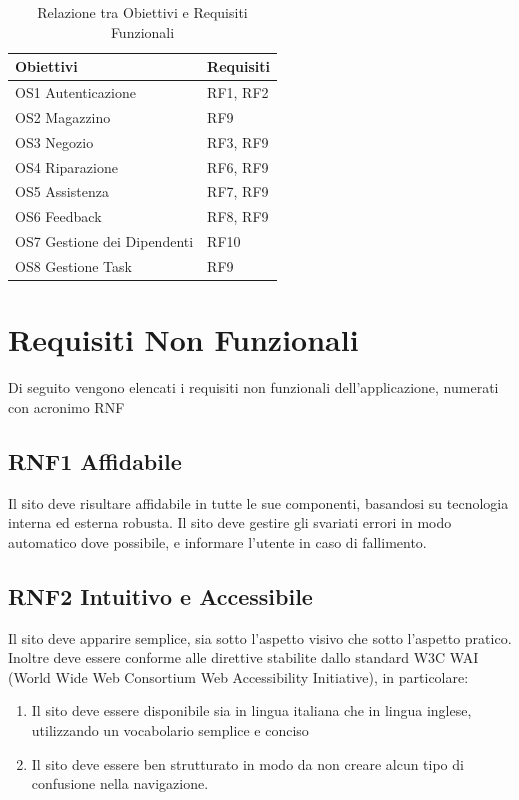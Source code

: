\documentclass{report}
\begin{document}
\begin{table}
\begin{center} %
	\centering
	\begin{tabular}{ |p{4cm}|p{4cm}|  }
		\hline
		\centering Obiettivi & \qquad\qquad Requisiti \\ %
		\hline
		OS1 Autenticazione & RF1, RF2 \\
		\hline
		OS2 Magazzino & RF9 \\
		\hline
		OS3 Negozio &
		RF3, RF9 \\
		\hline
		OS4 Riparazione & RF6, RF9\\
		\hline
		OS5 Assistenza & RF7, RF9 \\
		\hline
		OS6 Feedback & RF8, RF9 \\
		\hline
		OS7 Gestione dei Dipendenti & RF10 \\
		\hline
		OS8 Gestione Task & RF9 \\
		\hline
	\end{tabular}
\caption{Relazione tra Obiettivi e Requisiti Funzionali}
\end{center}
\end{table}


\section{Requisiti Non Funzionali}
Di seguito vengono elencati i requisiti non funzionali dell’applicazione, numerati con acronimo RNF

\subsection*{RNF1 Affidabile}
Il sito deve risultare affidabile in tutte le sue componenti, basandosi su tecnologia interna ed esterna robusta. Il sito deve gestire gli svariati errori in modo automatico dove possibile, e informare l’utente in caso di fallimento.

\subsection*{RNF2 Intuitivo e Accessibile}
Il sito deve apparire semplice, sia sotto l’aspetto visivo che sotto l’aspetto pratico. Inoltre deve essere conforme alle direttive stabilite dallo standard W3C WAI (World Wide Web Consortium Web Accessibility Initiative), in particolare:

\begin{enumerate}
	\item Il sito deve essere disponibile sia in lingua italiana che in lingua inglese, utilizzando un vocabolario semplice e conciso
	
	\item Il sito deve essere ben strutturato in modo da non creare alcun tipo di confusione nella navigazione.
\end{enumerate}
\end{document}
